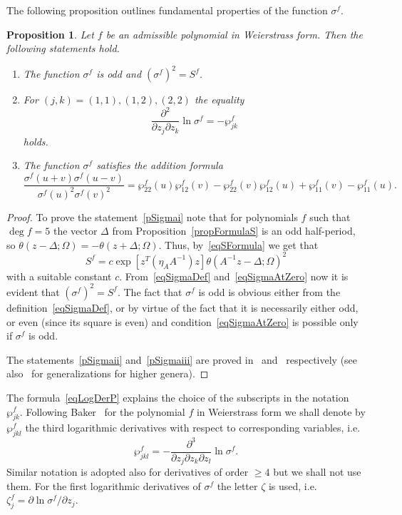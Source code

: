 \documentclass{amsart}
\numberwithin{equation}{section}
\newtheorem{proposition}[theorem]{Proposition}
\theoremstyle{definition}
\theoremstyle{remark}
\begin{document}
	The following proposition outlines fundamental properties of the function $\sigma^f$.
	
	\begin{proposition}\label{propSigmaProperties}
		Let $f$ be an admissible polynomial in Weierstrass form. Then the following statements hold.
		\begin{enumerate}[label=(\roman*)]
			\item\label{pSigmai} The function $\sigma^f$ is odd and $\left(\sigma^f\right)^2 = S^f$.
			\item\label{pSigmaii} For $(j,k) = (1,1), (1,2),(2,2)$ the equality
			\begin{equation}\label{eqLogDerP}
				\frac{\partial^2}{\partial z_j \partial z_k} \ln \sigma^f = -\wp_{jk}^f
			\end{equation}
			holds.
			\item\label{pSigmaiii} The function $\sigma^f$ satisfies the addition formula
			\[
			\frac{\sigma^f(u + v)\sigma^f(u - v)}{\sigma^f(u)^2\sigma^f(v)^2} = \wp_{22}^f(u)\wp_{12}^f(v) - \wp_{22}^f(v)\wp_{12}^f(u) + \wp_{11}^f(v) - \wp_{11}^f(u).
			\]
		\end{enumerate}
	\end{proposition}
	\begin{proof}
		To prove the statement~\ref{pSigmai} note that for polynomials $f$ such that $\deg f = 5$ the vector $\Delta$ from Proposition~\ref{propFormulaS} is an odd half-period, so $\theta(z - \Delta;\Omega) = -\theta(z + \Delta;\Omega)$. Thus, by~\eqref{eqSFormula} we get that 
		\[
		S^f = c\exp[z^T(\eta_A A^{-1})z]\theta(A^{-1}z - \Delta;\Omega)^2
		\]
		with a suitable constant $c$. From~\eqref{eqSigmaDef} and~\eqref{eqSigmaAtZero} now it is evident that $\left(\sigma^f\right)^2 = S^f$. The fact that $\sigma^f$ is odd is obvious either from the definition~\eqref{eqSigmaDef}, or by virtue of the fact that it is necessarily either odd, or even (since its square is even) and condition~\eqref{eqSigmaAtZero} is possible only if $\sigma^f$ is odd.
		
		The statements~\ref{pSigmaii} and~\ref{pSigmaiii} are proved in~\cite[\S~11]{baker} and~\cite[\S~30]{baker} respectively (see also~\cite{Buch} for generalizations for higher genera).
	\end{proof}
	The formula~\eqref{eqLogDerP} explains the choice of the subscripts in the notation $\wp_{jk}^f$. Following Baker~\cite{baker} for the polynomial $f$ in Weierstrass form we shall denote by $\wp_{jkl}^f$ the third logarithmic derivatives with respect to corresponding variables, i.e.
	\[
	\wp_{jkl}^f = -\frac{\partial^3}{\partial z_j\partial z_k \partial z_l} \ln \sigma^f.
	\]
	Similar notation is adopted also for derivatives of order $\ge 4$ but we shall not use them. For the first logarithmic derivatives of $\sigma^f$ the letter $\zeta$ is used, i.e. $\zeta_j^f = \partial \ln \sigma^f / \partial z_j$.
	
\end{document}
